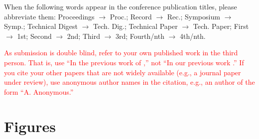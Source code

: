 \documentclass{article}
\begin{document}
When the following words appear in the conference publication titles, please abbreviate them: Proceedings $\rightarrow$ Proc.; Record $\rightarrow$ Rec.; Symposium $\rightarrow$ Symp.; Technical Digest $\rightarrow$ Tech. Dig.; Technical Paper $\rightarrow$ Tech. Paper; First $\rightarrow$ 1st; Second $\rightarrow$ 2nd; Third $\rightarrow$ 3rd; Fourth/nth $\rightarrow$ 4th/nth.

\textcolor{red}{As submission is double blind, refer to your own published work in the third person. That is, use ``In the previous work of \cite{Someone:10},'' not ``In our previous work \cite{Someone:10}.'' If you cite your other papers that are not widely available (e.g., a journal paper under review), use anonymous author names in the citation, e.g., an author of the form ``A. Anonymous.''}

\section{Figures}
\end{document}
